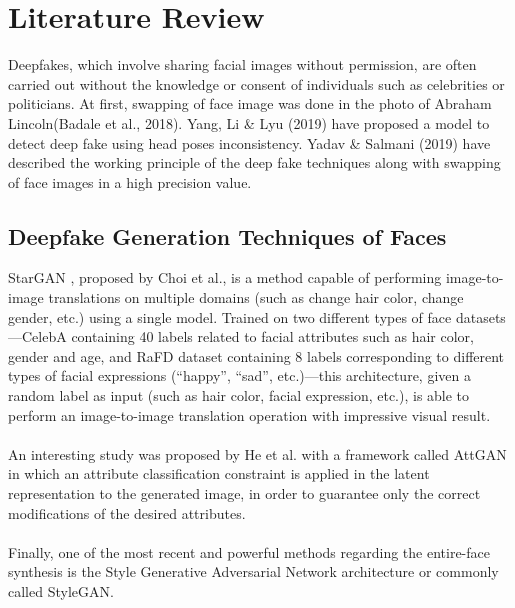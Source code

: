 \chapter{Literature Review}
Deepfakes, which involve sharing facial images without permission, are often carried out without the knowledge or consent of individuals such as celebrities or politicians. At first, swapping of face image was done in the photo of Abraham Lincoln(Badale et al., 2018)\cite{badale2018deep}. Yang, Li \& Lyu (2019)\cite{yang2019exposing} have proposed a model to detect deep fake using head poses inconsistency. Yadav \& Salmani (2019)\cite{yadav2019deepfake} have described the working principle of the deep fake techniques along with swapping of face images in a high precision value.

\section{Deepfake Generation Techniques of Faces}
StarGAN \cite{choi2018stargan}, proposed by Choi et al., is a method capable of performing image-to-image translations on multiple domains (such as change hair color, change gender,
etc.) using a single model. Trained on two different types of face datasets—CelebA \cite{7410782}
containing 40 labels related to facial attributes such as hair color, gender and age, and
RaFD dataset \cite{cho2019imagetoimage} containing 8 labels corresponding to different types of facial expressions
(“happy”, “sad”, etc.)—this architecture, given a random label as input (such as hair color, facial expression, etc.), is able to perform an image-to-image translation operation with impressive visual result. \\\\
An interesting study was proposed by He et al. \cite{7410782} with a framework called
AttGAN in which an attribute classification constraint is applied in the latent representation to the generated image, in order to guarantee only the correct modifications of the
desired attributes. \\\\
Finally, one of the most recent and powerful methods regarding the entire-face synthesis is the Style Generative Adversarial Network architecture or commonly called
StyleGAN. \cite{Giudice_2021}

